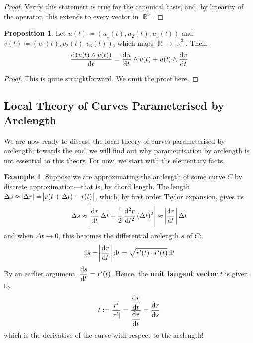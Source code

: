 \documentclass{amsart} %
\theoremstyle{mytheoremstyle}
\theoremstyle{definition}
\newtheorem{proposition}[definition]{Proposition}
\newtheorem{example}[definition]{Example}
\numberwithin{equation}{section}
\DeclareMathOperator{\R}{\mathbb{R}}
\DeclareMathOperator{\1}{\mathbbm{1}}
\DeclareMathOperator{\D}{\dif}
\begin{document}
\begin{proof}
	Verify this statement is true for the canonical basis, and, by linearity of the operator, this extends to every vector in $\R^3$.
\end{proof}


\begin{proposition}
	\label{propvectorproductlinearityderivative}
	Let $u(t) \coloneqq (u_1 (t),u_2(t),u_3(t))$ and $v(t) \coloneqq (v_1 (t),v_2(t),v_3(t))$, which maps $\R \to \R^3$. Then,
	\begin{align}
		\label{eqvectorproductderivative}
		\dod{(u(t) \wedge v(t))}{t} = \dod{u}{t} \wedge v(t) + u(t) \wedge \dod{v}{t}
	\end{align}
\end{proposition}

\begin{proof}
	This is quite straightforward. We omit the proof here.
\end{proof}


\subsection{Local Theory of Curves Parameterised by Arclength}

We are now ready to discuss the local theory of curves parameterised by arclength; towards the end, we will find out why parametrisation by arclength is not essential to this theory. For now, we start with the elementary facts.

\begin{example}
	Suppose we are approximating the arclength of some curve $C$ by discrete approximation---that is, by chord length. The length $\Delta s \approx \abs{\Delta r} = \abs{r(t+\Delta t) - r(t)}$, which, by first order Taylor expansion, gives us
	\begin{align*}
		\Delta s \approx \abs{\dod{r}{t} \Delta t + \frac{1}{2} \dod[2]{r}{t} (\Delta t)^2 } \approx \abs{\dod{r}{t}} \Delta t
	\end{align*}
	and when $\Delta t \to 0$, this becomes the differential arclength $s$ of $C$:
	\begin{align*}
		\D s = \abs{\dod{r}{t}} \D t = \sqrt{r'(t) \cdot r'(t)} \D t 
	\end{align*}
	By an earlier argument, $\dod{s}{t} = r'(t)$. Hence, the \textbf{unit tangent vector} $t$ is given by
	\begin{align*}
		t \coloneqq \frac{r'}{\abs{r'}} = \frac{\dod{r}{t}}{\dod{s}{t}} = \dod{r}{s}
	\end{align*}
	which is the derivative of the curve with respect to the arclength!
\end{example}
\end{document}
